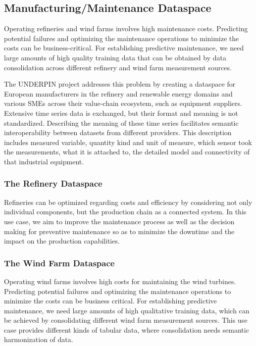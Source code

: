 \documentclass[
  super,
  preprint,
  3p]{elsarticle}
\begin{document}
\subsection{Manufacturing/Maintenance
Dataspace}\label{manufacturingmaintenance-dataspace}

Operating refineries and wind farms involves high maintenance costs.
Predicting potential failures and optimizing the maintenance operations
to minimize the costs can be business-critical. For establishing
predictive maintenance, we need large amounts of high quality training
data that can be obtained by data consolidation across different
refinery and wind farm measurement sources.

The UNDERPIN project addresses this problem by creating a dataspace for
European manufacturers in the refinery and renewable energy domains and
various SMEs across their value-chain ecosystem, such as equipment
suppliers. Extensive time series data is exchanged, but their format and
meaning is not standardized. Describing the meaning of these time series
facilitates semantic interoperability between datasets from different
providers. This description includes measured variable, quantity kind
and unit of measure, which sensor took the measurements, what it is
attached to, the detailed model and connectivity of that industrial
equipment.

\subsubsection{The Refinery Dataspace}\label{the-refinery-dataspace}

Refineries can be optimized regarding costs and efficiency by
considering not only individual components, but the production chain as
a connected system. In this use case, we aim to improve the maintenance
process as well as the decision making for preventive maintenance so as
to minimize the downtime and the impact on the production capabilities.

\subsubsection{The Wind Farm Dataspace}\label{the-wind-farm-dataspace}

Operating wind farms involves high costs for maintaining the wind
turbines. Predicting potential failures and optimizing the maintenance
operations to minimize the costs can be business critical. For
establishing predictive maintenance, we need large amounts of high
qualitative training data, which can be achieved by consolidating
different wind farm measurement sources. This use case provides
different kinds of tabular data, where consolidation needs semantic
harmonization of data.
\end{document}

